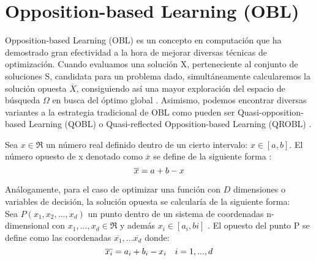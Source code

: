 

\section{Opposition-based Learning (OBL)}
\label{sec:OBL}

Opposition-based Learning (OBL) \cite{obl, obl2, OPSO, OPSO2, OPSO3} es un concepto en computación que ha demostrado gran efectividad a la hora de mejorar diversas técnicas de optimización. Cuando evaluamos una solución X, perteneciente al conjunto de soluciones S, candidata para un problema dado, simultáneamente  
 calcularemos la solución opuesta $\overline{X}$, consiguiendo así una mayor exploración del espacio de búsqueda $\Omega$ en busca del óptimo global \cite{obl}. Asimismo, podemos encontrar diversas variantes a la estrategia tradicional de OBL como pueden ser Quasi-opposition-based Learning (QOBL) o Quasi-reflected Opposition-based Learning (QROBL) \cite{Segredo2017_2}.

Sea $x \in \Re $  un número real definido dentro de un cierto intervalo: $x \in [a,b]$. El número opuesto de x denotado como $\overline{x}$ se define de la siguiente forma \cite{obl}: \\
 \begin{equation}
     \overline{x} = a + b - x  \\
 \end{equation}

Análogamente, para el caso de optimizar una función con $D$ dimensiones o variables de decisión, la solución opuesta se calcularía de la siguiente forma: \\

 Sea $ P(x_{1}, x_{2},...,x_{d}) $ un punto dentro de un sistema de coordenadas n-dimensional con $ x_{1},...,x_{d} \in \Re$ y además $ x_{i} \in [a_{i}, b{i}]$ \cite{obl}. El opuesto del punto P se define como las coordenadas $\overline{x_{1}},...\overline{x_{d}}$ donde:\\
\begin{equation}
    \overline{x_{i}} = a_{i} + b_{i} - x_{i} \quad i = 1,...,d \\
\end{equation}

